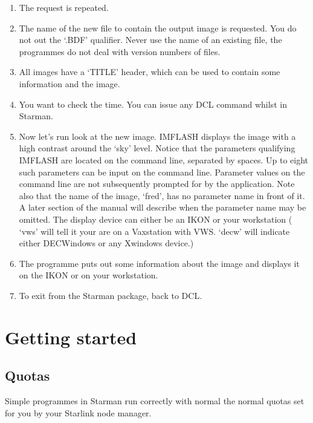 \begin{enumerate}
\item The request is repeated.

\item The name of the new file to contain the output image is requested.
You do not out the `.BDF' qualifier. Never use the name of an existing
file, the programmes do not deal with version numbers of files.

\item All images have a `TITLE' header, which can be used to contain
some information and the image.

\item You want to check the time. You can issue any DCL command whilst
in Starman.

\item Now let's run look at the new image. IMFLASH displays the image with
a high contrast around the `sky' level. Notice that the parameters
qualifying IMFLASH are located on the command line, separated by spaces. 
Up to eight such parameters can be input on the command line. Parameter
values on the command line are not subsequently prompted for by the
application. Note also that the name of the image, `fred', has no parameter
name in front of it. A later section of the manual will describe when the
parameter name may be omitted. The display device can either be an IKON
or your workstation ( `vws' will tell it your are on a Vaxstation with VWS.
`decw' will indicate either DECWindows or any Xwindows device.)

\item The programme puts out some information about the image and displays
it on the IKON or on your workstation.

\item To exit from the Starman package, back to DCL. 

\end{enumerate}

\newpage


\section{Getting started}

\subsection{Quotas}

Simple programmes in Starman run correctly with normal the normal quotas
set for you by your Starlink node manager. 

